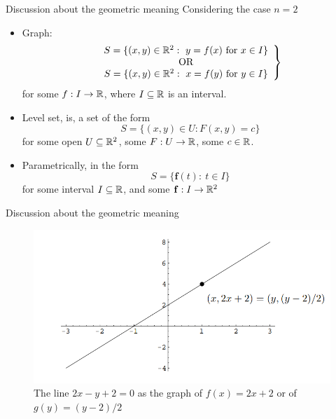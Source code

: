 \begin{frame}{Discussion about the geometric meaning}
    Considering the case $n = 2$
    \begin{itemize}
        \item Graph: \begin{equation}
        \left. 
        \begin{array}{c}
        S = \{ (x,y) \in \mathbb{R}^2:  \ y = f(x) \text{ for }x\in I\}\\
        \text{OR} \\
        S = \{ (x,y) \in \mathbb{R}^2:  \ x = f(y) \text{ for }y\in I\}
        \end{array}\right\}
        \label{graph}
        \end{equation}
        for some $f:I\to \mathbb{R}$, where $I\subseteq \mathbb{R}$ is an interval.
        \item Level set, is, a set of the form
        \begin{equation}
            S    = \{ (x,y)\in U : F(x,y) = c \} 
        \label{locus}\end{equation}
        for some open $U\subseteq \mathbb{R}^2$, some $F:U\to \mathbb{R}$, some $c\in \mathbb{R}$.
        \item Parametrically, in the form
        \begin{equation}
        S    = \{  \mathbf f(t) :  \ t\in I \} 
        \label{parametrically}\end{equation}
        for some interval $I\subseteq \mathbb{R}$, and some $\mathbf f:I\to \mathbb{R}^2$
    \end{itemize}
\end{frame}

\begin{frame}{Discussion about the geometric meaning}
    \begin{figure}[h!]
        \includegraphics[width=0.75\linewidth]{figures/implicit_function_example01.png}
        \caption{The line $2x − y + 2 = 0$ as the graph of $f(x) = 2x + 2$ or of $g(y) = (y − 2)/2$}
    \end{figure}
\end{frame}

